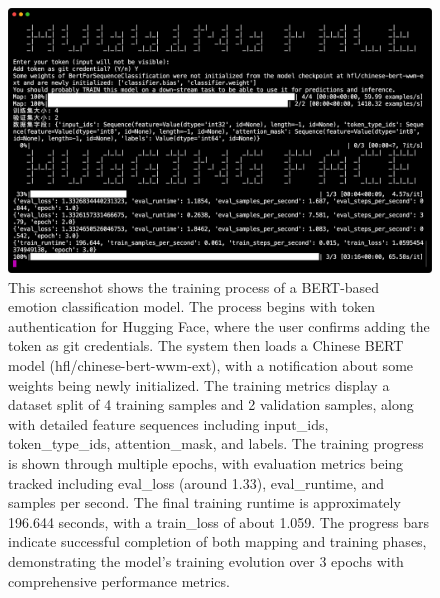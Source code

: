 \documentclass[journal]{IEEEtran}
\begin{document}
\begin{figure}[htb]
    \centering
    \includegraphics[width=\linewidth]{figures/figure_1.jpg}
    \caption{
    This screenshot shows the training process of a BERT-based emotion classification model. The process begins with token authentication for Hugging Face, where the user confirms adding the token as git credentials. The system then loads a Chinese BERT model (hfl/chinese-bert-wwm-ext), with a notification about some weights being newly initialized. The training metrics display a dataset split of 4 training samples and 2 validation samples, along with detailed feature sequences including input_ids, token_type_ids, attention_mask, and labels. The training progress is shown through multiple epochs, with evaluation metrics being tracked including eval_loss (around 1.33), eval_runtime, and samples per second. The final training runtime is approximately 196.644 seconds, with a train_loss of about 1.059. The progress bars indicate successful completion of both mapping and training phases, demonstrating the model's training evolution over 3 epochs with comprehensive performance metrics.
}
    \label{fig:my_label}
\end{figure}
\end{document}
